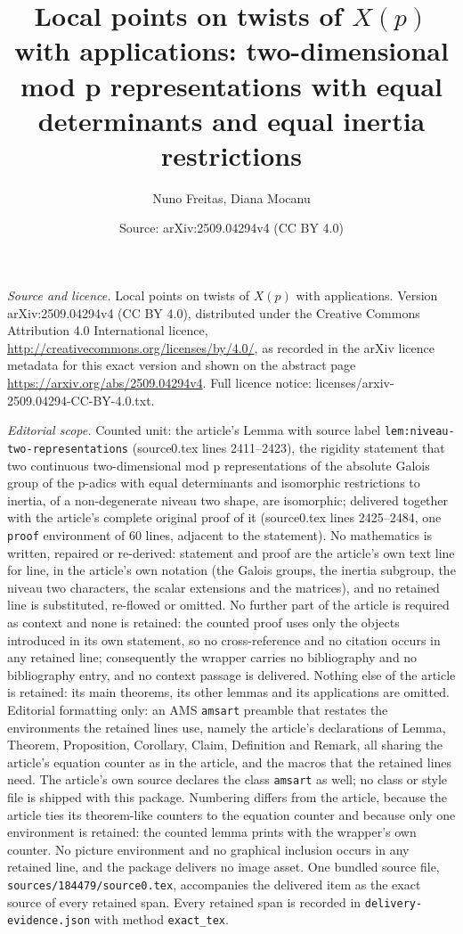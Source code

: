 \documentclass[10pt,a4paper]{amsart}
\title[Local points on twists of X(p)]{Local points on twists of $X(p)$ with applications: two-dimensional mod p representations with equal determinants and equal inertia restrictions}
\author{Nuno Freitas, Diana Mocanu}
\date{Source: arXiv:2509.04294v4 (CC BY 4.0)}
\theoremstyle{plain}
\theoremstyle{remark}
\begin{document}
\maketitle
\noindent\emph{Source and licence.} Local points on twists of $X(p)$ with applications. Version arXiv:2509.04294v4 (CC BY 4.0), distributed under the Creative Commons Attribution 4.0 International licence, \url{http://creativecommons.org/licenses/by/4.0/}, as recorded in the arXiv licence metadata for this exact version and shown on the abstract page \url{https://arxiv.org/abs/2509.04294v4}. Full licence notice: licenses/arxiv-2509.04294-CC-BY-4.0.txt.\par\smallskip

\noindent\textit{Editorial scope.} Counted unit: the article's Lemma with source label \texttt{lem:niveau-two-representations} (source0.tex lines 2411--2423), the rigidity statement that two continuous two-dimensional mod p representations of the absolute Galois group of the p-adics with equal determinants and isomorphic restrictions to inertia, of a non-degenerate niveau two shape, are isomorphic; delivered together with the article's complete original proof of it (source0.tex lines 2425--2484, one \texttt{proof} environment of 60 lines, adjacent to the statement). No mathematics is written, repaired or re-derived: statement and proof are the article's own text line for line, in the article's own notation (the Galois groups, the inertia subgroup, the niveau two characters, the scalar extensions and the matrices), and no retained line is substituted, re-flowed or omitted. No further part of the article is required as context and none is retained: the counted proof uses only the objects introduced in its own statement, so no cross-reference and no citation occurs in any retained line; consequently the wrapper carries no bibliography and no bibliography entry, and no context passage is delivered. Nothing else of the article is retained: its main theorems, its other lemmas and its applications are omitted. Editorial formatting only: an AMS \texttt{amsart} preamble that restates the environments the retained lines use, namely the article's declarations of Lemma, Theorem, Proposition, Corollary, Claim, Definition and Remark, all sharing the article's equation counter as in the article, and the macros that the retained lines need. The article's own source declares the class \texttt{amsart} as well; no class or style file is shipped with this package. Numbering differs from the article, because the article ties its theorem-like counters to the equation counter and because only one environment is retained: the counted lemma prints with the wrapper's own counter. No picture environment and no graphical inclusion occurs in any retained line, and the package delivers no image asset. One bundled source file, \texttt{sources/184479/source0.tex}, accompanies the delivered item as the exact source of every retained span. Every retained span is recorded in \texttt{delivery-evidence.json} with method \texttt{exact\_tex}.
\end{document}
